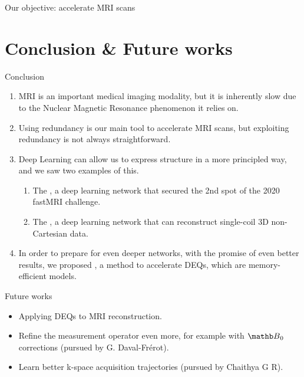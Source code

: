 \documentclass[aspectratio=169,xcolor=dvipsnames]{beamer}
\begin{document}
\begin{frame}{Our objective: accelerate MRI scans}
    \setlength{\parskip}{1ex}
    \begin{multicols}{2}
    \tableofcontents
    \end{multicols}
\end{frame}








% 



\section{Conclusion \& Future works}

\begin{frame}{Conclusion}
    \begin{enumerate}[<+->]
        \item MRI is an important medical imaging modality, but it is inherently slow due to the Nuclear Magnetic Resonance phenomenon it relies on.
        \item Using redundancy is our main tool to accelerate MRI scans, but exploiting redundancy is not always straightforward.
        \item Deep Learning can allow us to express structure in a more principled way, and we saw two examples of this.
        \begin{enumerate}[<+->]
            \item The , a deep learning network that secured the 2nd spot of the 2020 fastMRI challenge.
            \item The , a deep learning network that can reconstruct single-coil 3D non-Cartesian data.
        \end{enumerate}
        \item In order to prepare for even deeper networks, with the promise of even better results, we proposed , a method to accelerate DEQs, which are memory-efficient models.
    \end{enumerate}
\end{frame}

\begin{frame}{Future works}
    \begin{itemize}
        \item Applying DEQs to MRI reconstruction.
        \item Refine the measurement operator even more, for example with $\Bb_0$ corrections (pursued by G. Daval-Fr\'{e}rot).
        \item Learn better k-space acquisition trajectories (pursued by Chaithya G R).
    \end{itemize}
\end{frame}
\end{document}
